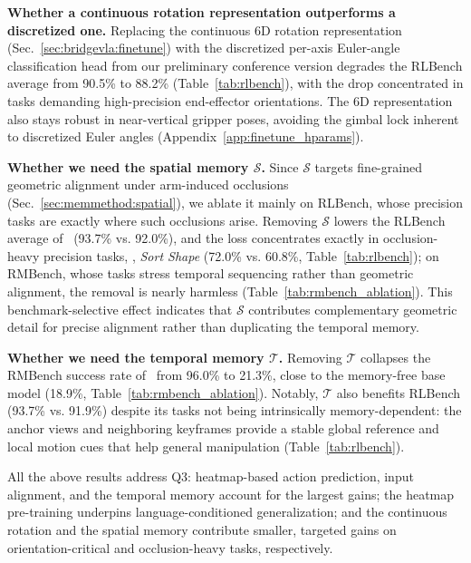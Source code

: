 \textbf{Whether a continuous rotation representation outperforms a discretized one.}
Replacing the continuous 6D rotation representation (Sec.~\ref{sec:bridgevla:finetune}) with the discretized per-axis Euler-angle classification head from our preliminary conference version degrades the RLBench average from 90.5\% to 88.2\% (Table~\ref{tab:rlbench}), with the drop concentrated in tasks demanding high-precision end-effector orientations.
The 6D representation also stays robust in near-vertical gripper poses, avoiding the gimbal lock inherent to discretized Euler angles (Appendix~\ref{app:finetune_hparams}).

\textbf{Whether we need the spatial memory $\mathcal{S}$.}
Since $\mathcal{S}$ targets fine-grained geometric alignment under arm-induced occlusions (Sec.~\ref{sec:memmethod:spatial}), we ablate it mainly on RLBench, whose precision tasks are exactly where such occlusions arise.
Removing $\mathcal{S}$ lowers the RLBench average of \memmethod\ (93.7\% vs. 92.0\%), and the loss concentrates exactly in occlusion-heavy precision tasks, \eg, \emph{Sort Shape} (72.0\% vs. 60.8\%, Table~\ref{tab:rlbench}); on RMBench, whose tasks stress temporal sequencing rather than geometric alignment, the removal is nearly harmless (Table~\ref{tab:rmbench_ablation}).
This benchmark-selective effect indicates that $\mathcal{S}$ contributes complementary geometric detail for precise alignment rather than duplicating the temporal memory.

\textbf{Whether we need the temporal memory $\mathcal{T}$.}
Removing $\mathcal{T}$ collapses the RMBench success rate of \memmethod\ from 96.0\% to 21.3\%, close to the memory-free base model (18.9\%, Table~\ref{tab:rmbench_ablation}).
Notably, $\mathcal{T}$ also benefits RLBench (93.7\% vs. 91.9\%) despite its tasks not being intrinsically memory-dependent: the anchor views and neighboring keyframes provide a stable global reference and local motion cues that help general manipulation (Table~\ref{tab:rlbench}).

All the above results address Q3: heatmap-based action prediction, input alignment, and the temporal memory account for the largest gains; the heatmap pre-training underpins language-conditioned generalization; and the continuous rotation and the spatial memory contribute smaller, targeted gains on orientation-critical and occlusion-heavy tasks, respectively.
